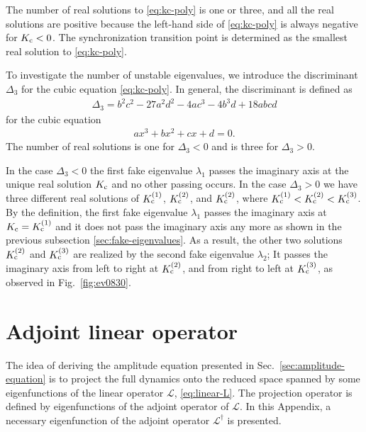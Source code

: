 The number of real solutions to \eqref{eq:kc-poly} is one or three,
and all the real solutions are positive
because the left-hand side of \eqref{eq:kc-poly}
is always negative for $K_{\rm c}<0$.
The synchronization transition point is determined
as the smallest real solution to \eqref{eq:kc-poly}.

To investigate the number of unstable eigenvalues,
we introduce the discriminant $\Delta_{3}$ for the cubic equation
\eqref{eq:kc-poly}. In general, the discriminant is defined as
\begin{align}
  \Delta_{3} = b^{2}c^{2} - 27a^{2}d^{2} - 4ac^{3} - 4b^{3}d + 18abcd
\end{align}
for the cubic equation
\begin{align}
  ax^{3}+bx^{2}+cx+d=0.
\end{align}
The number of real solutions is one for $\Delta_{3}<0$
and is three for $\Delta_{3}>0$.

In the case $\Delta_{3}<0$ the first fake eigenvalue $\lambda_{1}$
passes the imaginary axis at the unique real solution $K_{\rm c}$
and no other passing occurs.
In the case $\Delta_{3}>0$ we have three different real solutions
of $K_{\rm c}^{(1)}$, $K_{\rm c}^{(2)}$, and $K_{\rm c}^{(2)}$,
where $K_{\rm c}^{(1)}<K_{\rm c}^{(2)}<K_{\rm c}^{(3)}$.
By the definition, the first fake eigenvalue $\lambda_{1}$
passes the imaginary axis at $K_{\rm c}=K_{\rm c}^{(1)}$
and it does not pass the imaginary axis any more
as shown in the previous subsection \ref{sec:fake-eigenvalues}.
As a result, the other two solutions $K_{\rm c}^{(2)}$ and $K_{\rm c}^{(3)}$
are realized by the second fake eigenvalue $\lambda_{2}$;
It passes the imaginary axis from left to right at $K_{\rm c}^{(2)}$,
and from right to left at $K_{\rm c}^{(3)}$,
as observed in Fig.~\ref{fig:ev0830}.



\section{Adjoint linear operator}
\label{sec:adjoint}
  The idea of deriving the amplitude equation presented
  in Sec.~\ref{sec:amplitude-equation} is to project the full dynamics
  onto the reduced space spanned by some eigenfunctions of
  the linear operator $\mathcal{L}$, \eqref{eq:linear-L}.
  The projection operator is defined by eigenfunctions
  of the adjoint operator of $\mathcal{L}$.
  In this Appendix, a necessary eigenfunction of the adjoint operator
  $\mathcal{L}^{\dagger}$ is presented.

